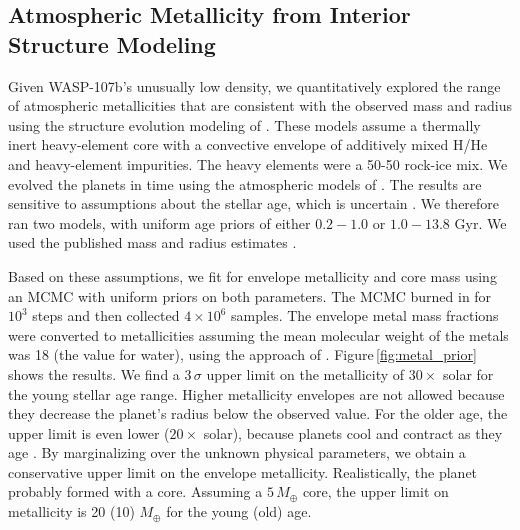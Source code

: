 \documentclass[twocolumn, trackchanges]{aastex61}
\begin{document}
\subsection{Atmospheric Metallicity from Interior Structure Modeling}
\label{sec:interior}
Given WASP-107b's unusually low density, we quantitatively explored the range of atmospheric metallicities that are consistent with the observed mass and radius using the structure evolution modeling of \cite{thorngren16}.  These models assume a thermally inert heavy-element core with a convective envelope of additively mixed H/He \citep{saumon95} and heavy-element impurities.  The heavy elements were a 50-50 rock-ice mix. We evolved the planets in time using the atmospheric models of \cite{fortney07}.  The results are sensitive to assumptions about the stellar age, which is uncertain \citep[either $0.6\pm0.2$ to $8.3\pm4.3$ Gyr depending on model assumptions;][]{mocnik17}. We therefore ran two models, with uniform age priors of either $0.2-1.0$ or $1.0-13.8$ Gyr.  We used the published mass and radius estimates \citep[$0.12\pm0.01\,M_\mathrm{J}$, $0.94\pm0.02$;][]{anderson17}.  %

Based on these assumptions, we fit for envelope metallicity and core mass using an MCMC with uniform priors on both parameters.  The MCMC burned in for $10^3$ steps and then collected $4\times10^6$ samples.  The envelope metal mass fractions were converted to metallicities assuming the mean molecular weight of the metals was 18 (the value for water), using the approach of \cite{fortney13}. Figure\,\ref{fig:metal_prior} shows the results.  We find a $3\,\sigma$ upper limit on the metallicity of $30\times$ solar for the young stellar age range.  Higher metallicity envelopes are not allowed because they decrease the planet's radius below the observed value.  For the older age, the upper limit is even lower ($20\times$ solar), because planets cool and contract as they age \citep{fortney08}.   By marginalizing over the unknown physical parameters, we obtain a conservative upper limit on the envelope metallicity.   Realistically, the planet probably formed with a core. Assuming a $5\,M_\oplus$ core, the upper limit on metallicity is 20 (10) $M_\oplus$ for the young (old) age.  
\end{document}
